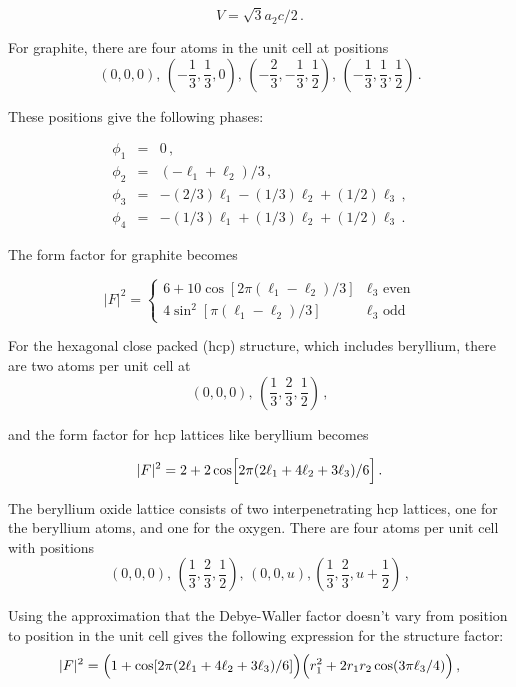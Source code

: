\begin{equation}
   V=\sqrt{3}a_2c/2\,.
\end{equation}

\noindent
For graphite, there are four atoms in the unit cell at positions\cite{Wycoff}
$$
   (0,0,0),\,(-\frac{1}{3},\frac{1}{3},0),\,
      (-\frac{2}{3},-\frac{1}{3},\frac{1}{2}),\,
        (-\frac{1}{3},\frac{1}{3},\frac{1}{2})\,.
$$

\noindent
These positions give the following phases:

\begin{eqnarray}
   \phi_1 &=& 0\,,\\
   \phi_2 &=& (-\ell_1+\ell_2)/3\,,\\
   \phi_3 &=& -(2/3)\ell_1-(1/3)\ell_2+(1/2)\ell_3\,,\\
   \phi_4 &=& -(1/3)\ell_1+(1/3)\ell_2+(1/2)\ell_3\,.
\end{eqnarray}

\noindent
The form factor for graphite becomes

\begin{equation}
   |F|^2=\left\{
     \begin{array}{ll}
        6+10\cos[2\pi(\ell_1-\ell_2)/3] & \mbox{$\ell_3$ even}\\
        4\sin^2[\pi(\ell_1-\ell_2)/3] & \mbox{$\ell_3$ odd}
     \end{array}
   \right.
\end{equation}
\vspace{0.5 pt}

\noindent
For the hexagonal close packed (hcp) structure, which includes beryllium,
there are two atoms per unit cell at
$$
   (0,0,0),\,(\frac{1}{3},\frac{2}{3},\frac{1}{2})\,,
$$

\noindent
and the form factor for hcp lattices like beryllium becomes

\begin{equation}
   |F|^2=2+2\cos\Bigl[2\pi(2\ell_1+4\ell_2+3\ell_3)/6\Bigr]\,.
\end{equation}
\vspace{0.5 pt}

The beryllium oxide lattice consists of two interpenetrating hcp lattices,
one for the beryllium atoms, and one for the oxygen.  There are four atoms
per unit cell with positions
$$
   (0,0,0),\,(\frac{1}{3},\frac{2}{3},\frac{1}{2}),\,
    (0,0,u), (\frac{1}{3},\frac{2}{3},u+\frac{1}{2})\,,
$$
\vspace{0.5 pt}

\noindent
Using the approximation that the Debye-Waller factor doesn't vary from
position to position in the unit cell gives the following expression for
the structure factor:
\begin{equation}
   |F|^2=\Bigl(1+\cos[2\pi(2\ell_1+4\ell_2+3\ell_3)/6]\Bigr)
      \Bigl(r_1^2+2r_1r_2\cos(3\pi\ell_3/4)\Bigr)\,,
\end{equation}

